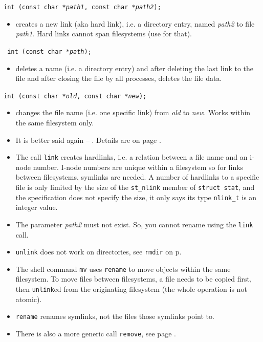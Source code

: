 \begin{slide}
\texttt{int (const char *\emph{path1}, const char *\emph{path2});}
\begin{itemize}
\item creates a new link (aka hard link), i.e. a directory entry, named
\emph{path2} to file \emph{path1}.  Hard links cannot span filesystems (use
 for that).
\end{itemize}
 \texttt{ int (const char *\emph{path});}
\begin{itemize}
\item deletes a name (i.e. a directory entry) and after deleting the last link to
the file and after closing the file by all processes, deletes the file data.
\end{itemize}
\texttt{int (const char *\emph{old}, const char *\emph{new});}
\begin{itemize}
\item changes the file name (i.e. one specific link) from \emph{old} to
\emph{new}.  Works within the same filesystem only.
\end{itemize}
\end{slide}

\begin{itemize}
\item It is better said again -- .  Details are on page \pageref{FILEDELETE}.
\item The call \texttt{link} creates hardlinks, i.e. a relation between a file
name and an i-node number.  I-node numbers are unique within a filesystem so for
links between filesystems, symlinks are needed.  A number of hardlinks to a
specific file is only limited by the size of the \texttt{st\_nlink} member of
\texttt{struct stat}, and the specification does not specify the size, it only
says its type \texttt{nlink\_t} is an integer value.
\item The parameter \emph{path2} must not exist.  So, you cannot rename using
the \texttt{link} call.
\item \texttt{unlink} does not work on directories, see \texttt{rmdir} on
p\pageref{RMDIR}.
\item The shell command \texttt{mv} uses \texttt{rename} to move objects within
the same filesystem.  To move files between filesystems, a file needs to be
copied first, then \texttt{unlink}ed from the originating filesystem (the whole
operation is not atomic).
\item \texttt{rename} renames symlinks, not the files those symlinks point to.
\item There is also a more generic call \texttt{remove}, see page
\pageref{REMOVE}.
\end{itemize}

